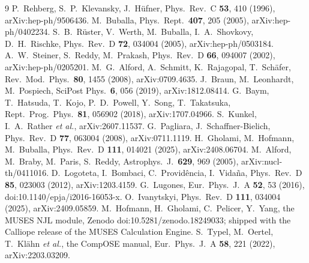 \documentclass[aps,prc,onecolumn,superscriptaddress,nofootinbib,10pt]{revtex4-2}
\begin{document}
\begin{thebibliography}{9}
 P.~Rehberg, S.~P.~Klevansky, J.~H\"ufner,
  Phys.\ Rev.\ C \textbf{53}, 410 (1996), arXiv:hep-ph/9506436.
 M.~Buballa, Phys.\ Rept.\ \textbf{407}, 205 (2005),
  arXiv:hep-ph/0402234.
 S.~B.~R\"uster, V.~Werth, M.~Buballa, I.~A.~Shovkovy,
  D.~H.~Rischke, Phys.\ Rev.\ D \textbf{72}, 034004 (2005),
  arXiv:hep-ph/0503184.
 A.~W.~Steiner, S.~Reddy, M.~Prakash,
  Phys.\ Rev.\ D \textbf{66}, 094007 (2002), arXiv:hep-ph/0205201.
 M.~G.~Alford, A.~Schmitt, K.~Rajagopal, T.~Sch\"afer,
  Rev.\ Mod.\ Phys.\ \textbf{80}, 1455 (2008), arXiv:0709.4635.
 J.~Braun, M.~Leonhardt, M.~Pospiech,
  SciPost Phys.\ \textbf{6}, 056 (2019), arXiv:1812.08414.
 G.~Baym, T.~Hatsuda, T.~Kojo, P.~D.~Powell, Y.~Song,
  T.~Takatsuka, Rept.\ Prog.\ Phys.\ \textbf{81}, 056902 (2018),
  arXiv:1707.04966.
 S.~Kunkel, I.~A.~Rather \textit{et al.},
  arXiv:2607.11537.
 G.~Pagliara, J.~Schaffner-Bielich,
  Phys.\ Rev.\ D \textbf{77}, 063004 (2008), arXiv:0711.1119.
 H.~Gholami, M.~Hofmann, M.~Buballa,
  Phys.\ Rev.\ D \textbf{111}, 014021 (2025), arXiv:2408.06704.
 M.~Alford, M.~Braby, M.~Paris, S.~Reddy,
  Astrophys.\ J.\ \textbf{629}, 969 (2005), arXiv:nucl-th/0411016.
 D.~Logoteta, I.~Bombaci, C.~Provid\^encia, I.~Vida\~na,
  Phys.\ Rev.\ D \textbf{85}, 023003 (2012), arXiv:1203.4159.
 G.~Lugones, Eur.\ Phys.\ J.\ A \textbf{52}, 53 (2016),
  doi:10.1140/epja/i2016-16053-x.
 O.~Ivanytskyi,
  Phys.\ Rev.\ D \textbf{111}, 034004 (2025), arXiv:2409.05859.
 M.~Hofmann, H.~Gholami, C.~Pelicer, Y.~Yang, the MUSES NJL
  module, Zenodo doi:10.5281/zenodo.18249033; shipped with the Calliope release
  of the MUSES Calculation Engine.
 S.~Typel, M.~Oertel, T.~Kl\"ahn \textit{et al.},
  the CompOSE manual, Eur.\ Phys.\ J.\ A \textbf{58}, 221 (2022),
  arXiv:2203.03209.
\end{thebibliography}
\end{document}
